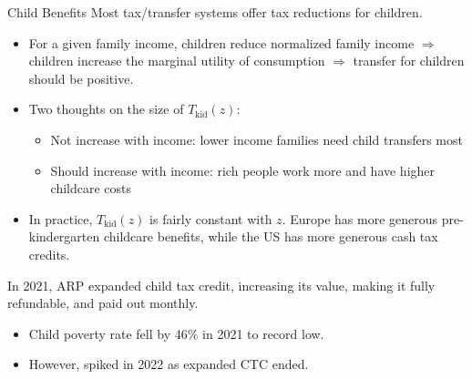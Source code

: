 \documentclass[10pt]{extarticle}
\begin{document}
  \begin{problem}{Child Benefits}
    Most tax/transfer systems offer tax reductions for children.
    \begin{itemize}
      \item For a given family income, children reduce normalized family income $\Rightarrow$ children increase the marginal utility of consumption $\Rightarrow$ transfer for children should be positive.
      \item Two thoughts on the size of $T_{\text{kid}}(z)$:
        \begin{itemize}
          \item Not increase with income: lower income families need child transfers most
          \item Should increase with income: rich people work more and have higher childcare costs
        \end{itemize}
      \item In practice, $T_{\text{kid}}(z)$ is fairly constant with $z$. Europe has more generous pre-kindergarten childcare benefits, while the US has more generous cash tax credits.
    \end{itemize}
    In 2021, ARP expanded child tax credit, increasing its value, making it fully refundable, and paid out monthly.
    \begin{itemize}
      \item Child poverty rate fell by 46\% in 2021 to record low.
      \item However, spiked in 2022 as expanded CTC ended.
    \end{itemize}
  \end{problem}
\end{document}
